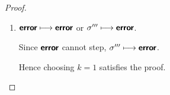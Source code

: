 \begin{proof}
\begin{enumerate}
\begin{itemize}
\begin{enumerate}
          Since $j'' \leq 1$, choosing $k = j''$ satisfies the proof.

        \item $\textbf{\textsf{error}} \longmapsto \textbf{\textsf{error}}$ or $\sigma''' \longmapsto
          \textbf{\textsf{error}}$.

          Since $\textbf{\textsf{error}}$ cannot step, $\sigma''' \longmapsto \textbf{\textsf{error}}$.

          Hence choosing $k = 1$ satisfies the proof.

        \end{enumerate}

      \end{itemize}

  \end{enumerate}

\end{proof}
